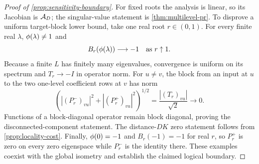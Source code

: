\begin{proof}[Proof of \cref{prop:sensitivity-boundary}]
For fixed roots the analysis is linear, so its Jacobian is $\mathcal A_D$; the
singular-value statement is \cref{thm:multilevel-pr}.  To disprove a uniform
target-block lower bound, take one real root $r\in(0,1)$.  For every finite
real $\lambda$, $\phi(\lambda)\neq1$ and
\begin{equation}
 B_r(\phi(\lambda))\longrightarrow -1
 \quad\text{as }r\uparrow1.
\end{equation}
Because a finite $L$ has finitely many eigenvalues, convergence is uniform on
its spectrum and $T_r\to-I$ in operator norm.  For $u\neq v$, the block from
an input at $u$ to the two one-level coefficient rows at $v$ has norm
\begin{equation}
 \left(|(P_r^-)_{vu}|^2+|(P_r^+)_{vu}|^2\right)^{1/2}
 =\frac{|(T_r)_{vu}|}{\sqrt2}\longrightarrow0.
\end{equation}
Functions of a block-diagonal operator remain block diagonal, proving the
disconnected-component statement.  The distance-$DK$ zero statement follows
from \cref{prop:locality-cost}.  Finally,
$\phi(0)=-1$ and $B_r(-1)=-1$ for real $r$, so $P_r^+$ is zero on every
zero eigenspace while $P_r^-$ is the identity there.  These examples coexist
with the global isometry and establish the claimed logical boundary.
\end{proof}
